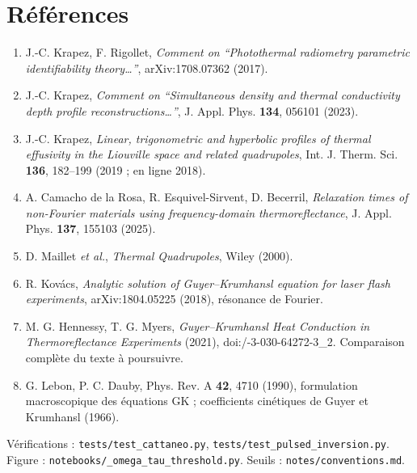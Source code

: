 \documentclass[11pt,a4paper]{article}
\begin{document}
\section{Références}

{\small
\begin{enumerate}[leftmargin=1.6em,itemsep=0pt]
\item J.-C. Krapez, F. Rigollet, \emph{Comment on ``Photothermal radiometry parametric identifiability
theory\ldots''}, arXiv:1708.07362 (2017).
\item J.-C. Krapez, \emph{Comment on ``Simultaneous density and thermal conductivity depth profile
reconstructions\ldots''}, J. Appl. Phys. \textbf{134}, 056101 (2023).
\item J.-C. Krapez, \emph{Linear, trigonometric and hyperbolic profiles of thermal effusivity in the
Liouville space and related quadrupoles}, Int. J. Therm. Sci. \textbf{136}, 182--199 (2019 ; en ligne 2018).
\item A. Camacho de la Rosa, R. Esquivel-Sirvent, D. Becerril, \emph{Relaxation times of non-Fourier
materials using frequency-domain thermoreflectance}, J. Appl. Phys. \textbf{137}, 155103 (2025).
\item D. Maillet \emph{et al.}, \emph{Thermal Quadrupoles}, Wiley (2000).
\item R. Kovács, \emph{Analytic solution of Guyer--Krumhansl equation for laser flash experiments}, arXiv:1804.05225 (2018), résonance de Fourier.
\item M. G. Hennessy, T. G. Myers, \emph{Guyer--Krumhansl Heat Conduction in Thermoreflectance Experiments} (2021), doi:/-3-030-64272-3\_2. Comparaison complète du texte à poursuivre.
\item G. Lebon, P. C. Dauby, Phys. Rev. A \textbf{42}, 4710 (1990), formulation macroscopique des équations GK ; coefficients cinétiques de Guyer et Krumhansl (1966).
\end{enumerate}}

\vspace{4pt}
\noindent\small
Vérifications : \texttt{tests/\allowbreak test\_\allowbreak cattaneo.py}, \texttt{tests/\allowbreak test\_\allowbreak pulsed\_\allowbreak inversion.py}.
Figure : \texttt{notebooks/\_\allowbreak omega\_\allowbreak tau\_\allowbreak threshold.py}. Seuils : \texttt{notes/\allowbreak conventions.md}.
\end{document}
